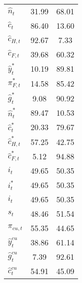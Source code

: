 \begin{center}
\begin{longtable}{lcc}
${\hat n_t}               $	 & 	             31.99	 & 	             68.01 \\ 
${\hat c_t}               $	 & 	             86.40	 & 	             13.60 \\ 
${\hat c_{H,t}}           $	 & 	             92.67	 & 	              7.33 \\ 
${\hat c_{F,t}}           $	 & 	             39.68	 & 	             60.32 \\ 
${\hat y_t^*}             $	 & 	             10.19	 & 	             89.81 \\ 
${\pi_{F,t}^*}            $	 & 	             14.58	 & 	             85.42 \\ 
${\hat g_t^*}             $	 & 	              9.08	 & 	             90.92 \\ 
${\hat n_t^*}             $	 & 	             89.47	 & 	             10.53 \\ 
${\hat c_t^*}             $	 & 	             20.33	 & 	             79.67 \\ 
${\hat c_{H,t}^*}         $	 & 	             57.25	 & 	             42.75 \\ 
${\hat c_{F,t}^*}         $	 & 	              5.12	 & 	             94.88 \\ 
${i_t}                    $	 & 	             49.65	 & 	             50.35 \\ 
${i_t^*}                  $	 & 	             49.65	 & 	             50.35 \\ 
${i_t}                    $	 & 	             49.65	 & 	             50.35 \\ 
${s_t}                    $	 & 	             48.46	 & 	             51.54 \\ 
${\pi_{cu,t}}             $	 & 	             55.35	 & 	             44.65 \\ 
${\hat y_t^{cu}}          $	 & 	             38.86	 & 	             61.14 \\ 
${\hat g_t^{cu}}          $	 & 	              7.39	 & 	             92.61 \\ 
${\hat c_t^{cu}}          $	 & 	             54.91	 & 	             45.09 \\ 
\end{longtable}
 \end{center}
